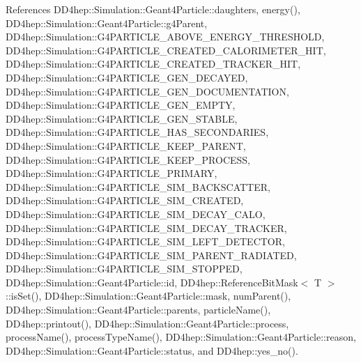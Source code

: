 References D\+D4hep\+::\+Simulation\+::\+Geant4\+Particle\+::daughters, energy(), D\+D4hep\+::\+Simulation\+::\+Geant4\+Particle\+::g4\+Parent, D\+D4hep\+::\+Simulation\+::\+G4\+P\+A\+R\+T\+I\+C\+L\+E\+\_\+\+A\+B\+O\+V\+E\+\_\+\+E\+N\+E\+R\+G\+Y\+\_\+\+T\+H\+R\+E\+S\+H\+O\+LD, D\+D4hep\+::\+Simulation\+::\+G4\+P\+A\+R\+T\+I\+C\+L\+E\+\_\+\+C\+R\+E\+A\+T\+E\+D\+\_\+\+C\+A\+L\+O\+R\+I\+M\+E\+T\+E\+R\+\_\+\+H\+IT, D\+D4hep\+::\+Simulation\+::\+G4\+P\+A\+R\+T\+I\+C\+L\+E\+\_\+\+C\+R\+E\+A\+T\+E\+D\+\_\+\+T\+R\+A\+C\+K\+E\+R\+\_\+\+H\+IT, D\+D4hep\+::\+Simulation\+::\+G4\+P\+A\+R\+T\+I\+C\+L\+E\+\_\+\+G\+E\+N\+\_\+\+D\+E\+C\+A\+Y\+ED, D\+D4hep\+::\+Simulation\+::\+G4\+P\+A\+R\+T\+I\+C\+L\+E\+\_\+\+G\+E\+N\+\_\+\+D\+O\+C\+U\+M\+E\+N\+T\+A\+T\+I\+ON, D\+D4hep\+::\+Simulation\+::\+G4\+P\+A\+R\+T\+I\+C\+L\+E\+\_\+\+G\+E\+N\+\_\+\+E\+M\+P\+TY, D\+D4hep\+::\+Simulation\+::\+G4\+P\+A\+R\+T\+I\+C\+L\+E\+\_\+\+G\+E\+N\+\_\+\+S\+T\+A\+B\+LE, D\+D4hep\+::\+Simulation\+::\+G4\+P\+A\+R\+T\+I\+C\+L\+E\+\_\+\+H\+A\+S\+\_\+\+S\+E\+C\+O\+N\+D\+A\+R\+I\+ES, D\+D4hep\+::\+Simulation\+::\+G4\+P\+A\+R\+T\+I\+C\+L\+E\+\_\+\+K\+E\+E\+P\+\_\+\+P\+A\+R\+E\+NT, D\+D4hep\+::\+Simulation\+::\+G4\+P\+A\+R\+T\+I\+C\+L\+E\+\_\+\+K\+E\+E\+P\+\_\+\+P\+R\+O\+C\+E\+SS, D\+D4hep\+::\+Simulation\+::\+G4\+P\+A\+R\+T\+I\+C\+L\+E\+\_\+\+P\+R\+I\+M\+A\+RY, D\+D4hep\+::\+Simulation\+::\+G4\+P\+A\+R\+T\+I\+C\+L\+E\+\_\+\+S\+I\+M\+\_\+\+B\+A\+C\+K\+S\+C\+A\+T\+T\+ER, D\+D4hep\+::\+Simulation\+::\+G4\+P\+A\+R\+T\+I\+C\+L\+E\+\_\+\+S\+I\+M\+\_\+\+C\+R\+E\+A\+T\+ED, D\+D4hep\+::\+Simulation\+::\+G4\+P\+A\+R\+T\+I\+C\+L\+E\+\_\+\+S\+I\+M\+\_\+\+D\+E\+C\+A\+Y\+\_\+\+C\+A\+LO, D\+D4hep\+::\+Simulation\+::\+G4\+P\+A\+R\+T\+I\+C\+L\+E\+\_\+\+S\+I\+M\+\_\+\+D\+E\+C\+A\+Y\+\_\+\+T\+R\+A\+C\+K\+ER, D\+D4hep\+::\+Simulation\+::\+G4\+P\+A\+R\+T\+I\+C\+L\+E\+\_\+\+S\+I\+M\+\_\+\+L\+E\+F\+T\+\_\+\+D\+E\+T\+E\+C\+T\+OR, D\+D4hep\+::\+Simulation\+::\+G4\+P\+A\+R\+T\+I\+C\+L\+E\+\_\+\+S\+I\+M\+\_\+\+P\+A\+R\+E\+N\+T\+\_\+\+R\+A\+D\+I\+A\+T\+ED, D\+D4hep\+::\+Simulation\+::\+G4\+P\+A\+R\+T\+I\+C\+L\+E\+\_\+\+S\+I\+M\+\_\+\+S\+T\+O\+P\+P\+ED, D\+D4hep\+::\+Simulation\+::\+Geant4\+Particle\+::id, D\+D4hep\+::\+Reference\+Bit\+Mask$<$ T $>$\+::is\+Set(), D\+D4hep\+::\+Simulation\+::\+Geant4\+Particle\+::mask, num\+Parent(), D\+D4hep\+::\+Simulation\+::\+Geant4\+Particle\+::parents, particle\+Name(), D\+D4hep\+::printout(), D\+D4hep\+::\+Simulation\+::\+Geant4\+Particle\+::process, process\+Name(), process\+Type\+Name(), D\+D4hep\+::\+Simulation\+::\+Geant4\+Particle\+::reason, D\+D4hep\+::\+Simulation\+::\+Geant4\+Particle\+::status, and D\+D4hep\+::yes\+\_\+no().



